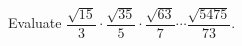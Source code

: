 Evaluate $\dfrac{\sqrt{15}}{3}\cdot\dfrac{\sqrt{35}}{5}\cdot\dfrac{\sqrt{63}}{7}\cdots\dfrac{\sqrt{5475}}{73}$.
